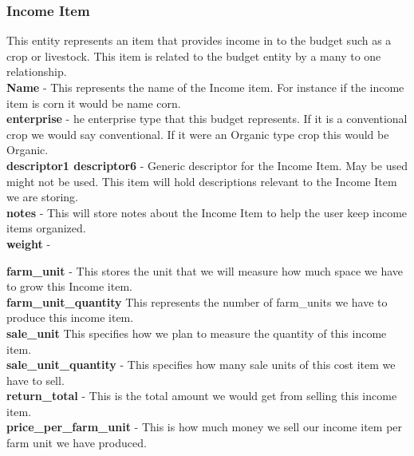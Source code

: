 \documentclass[onecolumn, draftclsnofoot,10pt, compsoc]{article}
\begin{document}
			\subsubsection{Income Item}
					This entity represents an item that provides income in to the budget such as a crop or livestock. This item is related to the budget entity by a many to one relationship.\\
					
					\textbf{Name} - This represents the name of the Income item. For instance if the income item is corn it would be name corn.\\
					
					\textbf{enterprise} - he enterprise type that this budget represents. If it is a conventional crop we would say conventional. If it were an Organic type crop this would be Organic.\\
					
					\textbf{descriptor1 \- descriptor6} - Generic descriptor for the Income Item. May be used might not be used. This item will hold descriptions relevant to the Income Item we are storing.\\
					
					\textbf{notes} - This will store notes about the Income Item to help the user keep income items organized.\\
					
					\textbf{weight} - 
					
					\textbf{farm\_unit} - This stores the unit that we will measure how much space we have to grow this Income item.\\
					
					\textbf{farm\_unit\_quantity} \- This represents the number of farm\_units we have to produce this income item.\\
					
					\textbf{sale\_unit} \- This specifies how we plan to measure the quantity of this income item.\\
					
					\textbf{sale\_unit\_quantity} - This specifies how many sale units of this cost item we have to sell.\\
					
					\textbf{return\_total} - This is the total amount we would get from selling this income item.\\
					
					\textbf{price\_per\_farm\_unit} - This is how much money we sell our income item per farm unit we have produced.\\
					
\end{document}
